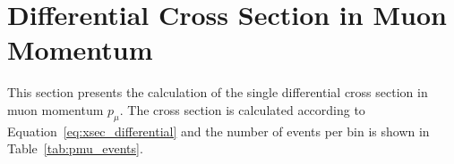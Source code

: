 
\section[Cross Section: Muon Momentum]{Differential Cross Section in Muon Momentum}
\label{sec:mumom_xsec}

This section presents the calculation of the single differential cross section in muon momentum $p_\mu$. The cross section is calculated according to Equation~\eqref{eq:xsec_differential} and the number of events per bin is shown in Table~\ref{tab:pmu_events}.

%


